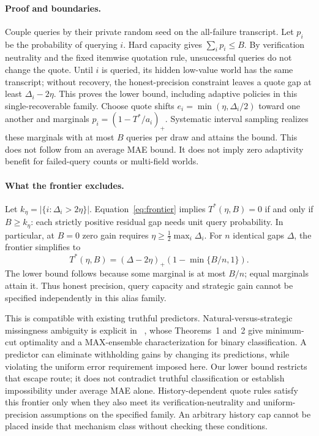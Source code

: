 \documentclass[11pt]{article}
\begin{document}
\paragraph{Proof and boundaries.}
Couple queries by their private random seed on the all-failure transcript.
Let $p_i$ be the probability of querying $i$. Hard capacity gives
$\sum_i p_i\le B$. By verification neutrality and the fixed itemwise quotation rule, unsuccessful queries do not change the quote. Until $i$ is queried, its hidden low-value world has the same
transcript; without recovery, the honest-precision constraint leaves a quote
gap at least $\Delta_i-2\eta$. This proves the lower bound, including adaptive
policies in this single-recoverable family. Choose quote shifts
$e_i=\min(\eta,\Delta_i/2)$ toward one another and marginals
$p_i=(1-T^*/a_i)_+$. Systematic interval sampling realizes these marginals with
at most $B$ queries per draw and attains the bound. This does not follow from
an average MAE bound. It does not imply zero adaptivity benefit for failed-query
counts or multi-field worlds.

\paragraph{What the frontier excludes.}
Let $k_\eta=|\{i:\Delta_i>2\eta\}|$. Equation~\eqref{eq:frontier}
implies $T^*(\eta,B)=0$ if and only if $B\geq k_\eta$: each strictly
positive residual gap needs unit query probability. In particular, at $B=0$
zero gain requires $\eta\geq\frac12\max_i\Delta_i$. For $n$ identical gaps
$\Delta$, the frontier simplifies to
\[
 T^*(\eta,B)=(\Delta-2\eta)_+\left(1-\min\{B/n,1\}\right).
\]
The lower bound follows because some marginal is at most $B/n$; equal
marginals attain it. Thus honest precision, query capacity and strategic gain
cannot be specified independently in this alias family.

This is compatible with existing truthful predictors. Natural-versus-strategic
missingness ambiguity is explicit in ~\cite{withheld}, whose Theorems~1 and~2
give minimum-cut optimality and a MAX-ensemble characterization for binary
classification. A predictor can eliminate withholding gains by changing its
predictions, while violating the uniform error requirement imposed here.
Our lower bound restricts that escape route; it does not contradict truthful
classification or establish impossibility under average MAE alone.
History-dependent quote rules satisfy this frontier only when they also meet
its verification-neutrality and uniform-precision assumptions on the specified
family. An arbitrary history cap cannot be placed inside that mechanism class
without checking these conditions.
\end{document}
